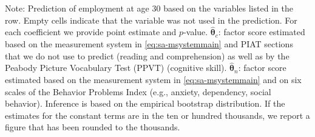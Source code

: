 \documentclass[static]{JJH-Beamer}
\begin{document}
\begin{frame}
\begin{table}[H]
\begin{center}
{}
\end{center}
\tiny \flushleft
Note: Prediction of employment at age 30 based on the variables listed in the row. Empty cells indicate that the variable was not used in the prediction. For each coefficient we provide point estimate and $p$-value. $\hat{\bm{\theta}}_{c}$: factor score estimated based on the measurement system in \eqref{eq:sa-msystemmain} and PIAT sections that we do not use to predict (reading and comprehension) as well as by the Peabody Picture Vocabulary Test (PPVT) (cognitive skill). $\hat{\bm{\theta}}_{n}$: factor score estimated based on the measurement system in \eqref{eq:sa-msystemmain} and on six scales of the Behavior Problems Index (e.g., anxiety, dependency, social behavior). Inference is based on the empirical bootstrap distribution. If the estimates for the constant terms are in the ten or hundred thousands, we report a figure that has been rounded to the thousands.\\
\end{table}

\end{frame}
\end{document}

